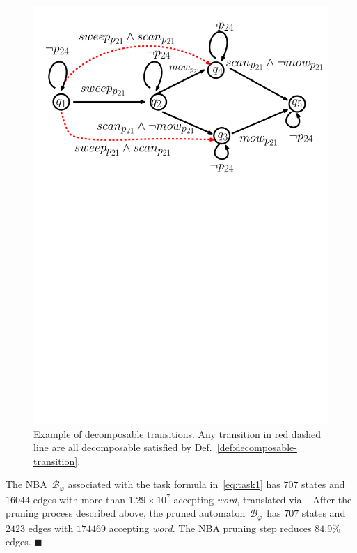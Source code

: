 \begin{figure}
\centering
\includegraphics[scale=0.3]{figures/example_decomposable.pdf}
\caption{
Example of decomposable transitions.
Any transition in red dashed line are all 
decomposable satisfied by Def.~\ref{def:decomposable-transition}.}
\label{fig:example_decomposable}
\end{figure}

\begin{example}\label{eq:prune-nba}
The NBA~$\mathcal{B}_{\varphi}$ associated with the task formula in~\eqref{eq:task1}
has $707$ states and $16044$ edges with more than $1.29\times10^7$ accepting \emph{word},
translated via~\cite{gastin2001fast}.
After the pruning process described above, the pruned automaton~$\mathcal{B}^{-}_{\varphi}$
has $707$ states and $2423$ edges with $174469$ accepting \emph{word}. The NBA pruning step reduces $84.9\%$ edges.
\hfill $\blacksquare$
\end{example}
